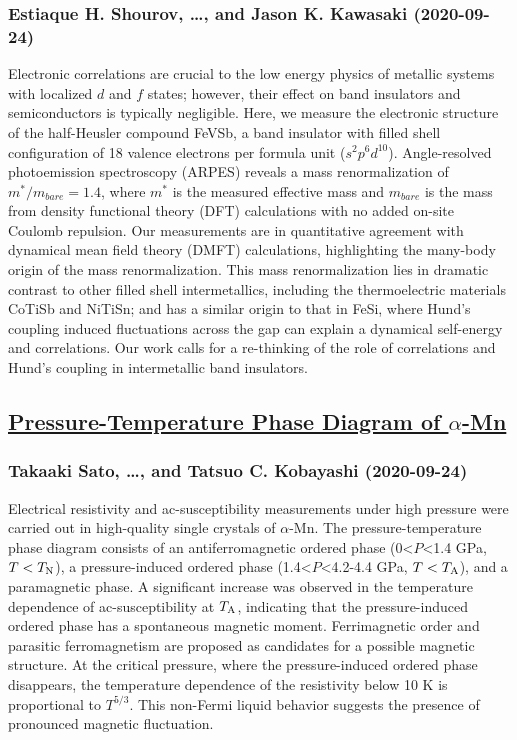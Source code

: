 \subsubsection*{Estiaque H. Shourov, \dots, and Jason K. Kawasaki (2020-09-24)}
Electronic correlations are crucial to the low energy physics of metallic
systems with localized $d$ and $f$ states; however, their effect on band
insulators and semiconductors is typically negligible. Here, we measure the
electronic structure of the half-Heusler compound FeVSb, a band insulator with
filled shell configuration of 18 valence electrons per formula unit ($s^2 p^6
d^{10}$). Angle-resolved photoemission spectroscopy (ARPES) reveals a mass
renormalization of $m^{*}/m_{bare}= 1.4$, where $m^{*}$ is the measured
effective mass and $m_{bare}$ is the mass from density functional theory (DFT)
calculations with no added on-site Coulomb repulsion. Our measurements are in
quantitative agreement with dynamical mean field theory (DMFT) calculations,
highlighting the many-body origin of the mass renormalization. This mass
renormalization lies in dramatic contrast to other filled shell intermetallics,
including the thermoelectric materials CoTiSb and NiTiSn; and has a similar
origin to that in FeSi, where Hund's coupling induced fluctuations across the
gap can explain a dynamical self-energy and correlations. Our work calls for a
re-thinking of the role of correlations and Hund's coupling in intermetallic
band insulators.

\subsection*{\href{http://arxiv.org/abs/2009.11488v1}{Pressure-Temperature Phase Diagram of $α$-Mn}}
\subsubsection*{Takaaki Sato, \dots, and Tatsuo C. Kobayashi (2020-09-24)}
Electrical resistivity and ac-susceptibility measurements under high pressure
were carried out in high-quality single crystals of $\alpha$-Mn. The
pressure-temperature phase diagram consists of an antiferromagnetic ordered
phase (0<$P$<1.4 GPa, $T<T_{\rm N}$), a pressure-induced ordered phase
(1.4<$P$<4.2-4.4 GPa, $T<T_{\rm A}$), and a paramagnetic phase. A significant
increase was observed in the temperature dependence of ac-susceptibility at
$T_{\rm A}$, indicating that the pressure-induced ordered phase has a
spontaneous magnetic moment. Ferrimagnetic order and parasitic ferromagnetism
are proposed as candidates for a possible magnetic structure. At the critical
pressure, where the pressure-induced ordered phase disappears, the temperature
dependence of the resistivity below 10 K is proportional to $T^{5/3}$. This
non-Fermi liquid behavior suggests the presence of pronounced magnetic
fluctuation.

